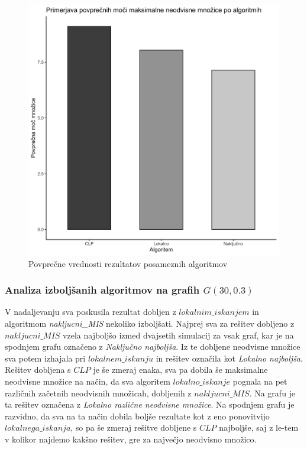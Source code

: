 \documentclass[a4paper, 12pt]{article}
\begin{document}
\begin{figure}[h!]
	\begin{center}
		\includegraphics[scale=0.10]{R_koda/pon-povpmoc.png}
		\caption{Povprečne vrednosti rezultatov posameznih algoritmov}
	\end{center}
\end{figure}

\subsubsection{Analiza izboljšanih algoritmov na grafih $G(30, 0.3)$}

\noindent V nadaljevanju sva poskusila rezultat dobljen z $lokalnim\_iskanjem$ in algoritmom \textit{nakljucni\_MIS} nekoliko izboljšati. 
Najprej sva za rešitev dobljeno z $nakljucni\_MIS$ vzela najboljšo izmed dvajsetih simulacij za vsak graf, kar je na spodnjem grafu označeno z 
\textit{Naključno najboljša}. Iz te dobljene neodvisne množice sva potem izhajala pri $lokalnem\_iskanju$ in rešitev označila kot
\textit{Lokalno najboljša}. Rešitev dobljena s $CLP$ je še zmeraj enaka, sva pa dobila še maksimalne neodvisne množice na način, da sva algoritem $lokalno\_iskanje$
pognala na pet različnih začetnih neodvisnih množicah, dobljenih z $nakljucni\_MIS$. Na grafu je ta rešitev označena z \textit{Lokalno različne neodvisne množice}. Na spodnjem grafu je razvidno, 
da sva na ta način dobila boljše rezultate kot z eno ponovitvijo $lokalnega\_iskanja$, so pa še zmeraj rešitve dobljene s $CLP$ najboljše, saj z le-tem v kolikor najdemo kakšno rešitev, gre za največjo neodvisno množico.
\end{document}
